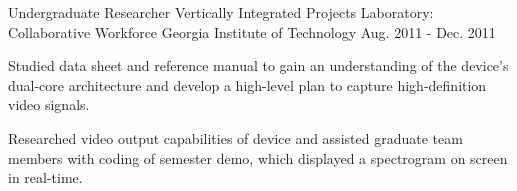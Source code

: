 

\begin{cventries}

  \cventry
    {Undergraduate Researcher} %
    {Vertically Integrated Projects Laboratory: Collaborative Workforce } %
    {Georgia Institute of Technology} %
    {Aug. 2011 - Dec. 2011} %
    {
      \begin{cvitems} %
        \item {Studied data sheet and reference manual to gain an understanding of the device's dual-core architecture and develop a high-level plan to capture high-definition video signals.}
        \item {Researched video output capabilities of device and assisted graduate team members with coding of semester demo, which displayed a spectrogram on screen in real-time.}
      \end{cvitems}
    }
\end{cventries}
